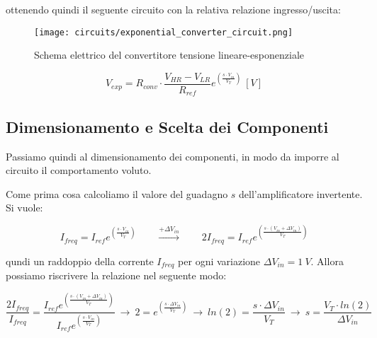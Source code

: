 ottenendo quindi il seguente circuito con la relativa relazione ingresso/uscita:

\begin{figure}[H]
    \centering
    \texttt{[image: circuits/exponential\_converter\_circuit.png]}
    \caption{Schema elettrico del convertitore tensione lineare-esponenziale}
    \label{exponential_converter_circuit}
\end{figure}

\begin{displaymath}
    V_{exp}=R_{conv}\cdot \frac{V_{HR}-V_{LR}}{R_{ref}}e^{\left(\frac{s\cdot V_{in}}{V_T}\right)}\ [V]
\end{displaymath}


\subsection*{Dimensionamento e Scelta dei Componenti}


Passiamo quindi al dimensionamento dei componenti, in modo da imporre al circuito il
comportamento voluto.

Come prima cosa calcoliamo il valore del guadagno $s$ dell'amplificatore invertente.
Si vuole:

\begin{displaymath}
    I_{freq}=I_{ref}e^{\left(\frac{s\cdot V_{in}}{V_T}\right)}
    \qquad
    \xrightarrow{+\Delta V_{in}}
    \qquad
    2I_{freq}=I_{ref}e^{\left(\frac{s\cdot(V_{in}+\Delta V_{in})}{V_T}\right)}
\end{displaymath}

qundi un raddoppio della corrente $I_{freq}$ per ogni variazione $\Delta V_{in}=1\ V$.
Allora possiamo riscrivere la relazione nel seguente modo:

\begin{displaymath}
    \frac{2I_{freq}}{I_{freq}}=
    \frac{I_{ref}e^{\left(\frac{s\cdot(V_{in}+\Delta V_{in})}{V_T}\right)}}
    {I_{ref}e^{\left(\frac{s\cdot V_{in}}{V_T}\right)}}
    \
    \rightarrow
    \
    2=e^{\left(\frac{s\cdot\Delta V_{in}}{V_T}\right)}
    \
    \rightarrow
    \
    ln(2)=\frac{s\cdot\Delta V_{in}}{V_T}
    \
    \rightarrow
    \
    s=\frac{V_T\cdot ln(2)}{\Delta V_{in}}
\end{displaymath}

